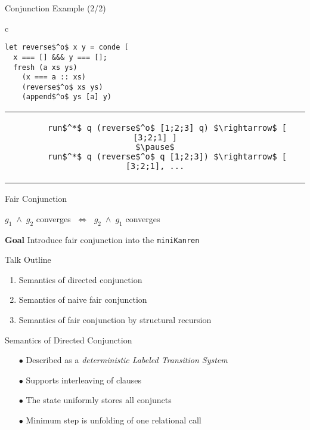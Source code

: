 \documentclass[14pt,aspectratio=169]{beamer}
\let\\\tabularnewline
\let\\\tabularnewline
\newcommand{\mk}{\texttt{miniKanren}\xspace}
\theoremstyle{definition}
\begin{document}
\begin{frame}[fragile]{Conjunction Example (2/2)}
\begin{center}
\begin{tabular}{c}
\begin{lstlisting}
let reverse$^o$ x y = conde [ 
  x === [] &&& y === []; 
  fresh (a xs ys) 
    (x === a :: xs)
    (reverse$^o$ xs ys)
    (append$^o$ ys [a] y)
\end{lstlisting} \\
\end{tabular}
\end{center}
\vskip1cm
\pause
\begin{center}
\begin{tabular}{c}
\begin{lstlisting}
     run$^*$ q (reverse$^o$ [1;2;3] q) $\rightarrow$ [ [3;2;1] ]
$\pause$
     run$^*$ q (reverse$^o$ q [1;2;3]) $\rightarrow$ [ [3;2;1], ...
\end{lstlisting}
\end{tabular}
\end{center}

\end{frame}

\begin{frame}[fragile]{Fair Conjunction}
\centering

$g_1 \; \land \; g_2$ converges $\;\Leftrightarrow\;$ $g_2 \; \land \; g_1$ converges

\vskip1cm
\textbf{Goal} \\
Introduce fair conjunction into the \mk

\end{frame}

\begin{frame}{Talk Outline}

\begin{enumerate}
  \item Semantics of directed conjunction
  \vskip6mm
  \item Semantics of naive fair conjunction
  \vskip6mm
  \item Semantics of fair conjunction by structural recursion
\end{enumerate}

\end{frame}

\begin{frame}[fragile]{Semantics of Directed Conjunction}
\begin{itemize}
    \item[$\bullet$] Described as a \emph{deterministic Labeled Transition System}
    \item[$\bullet$] Supports interleaving of clauses
    \item[$\bullet$] The state uniformly stores all conjuncts
    \item[$\bullet$] Minimum step is unfolding of one relational call
\end{itemize}
\end{frame}
\end{document}
